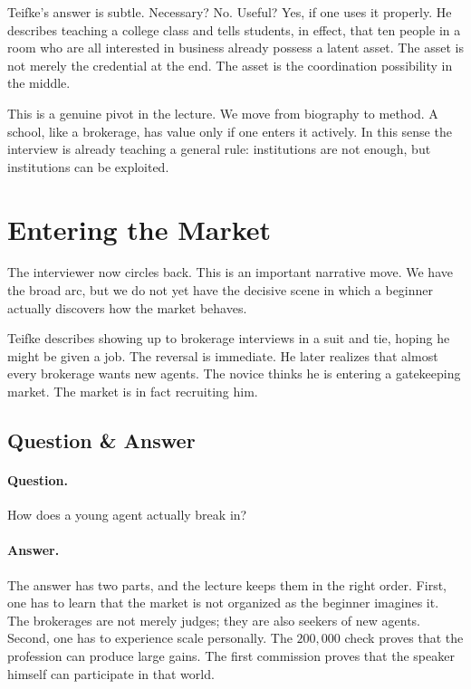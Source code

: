 Teifke's answer is subtle. Necessary? No. Useful? Yes, if one uses it properly. He describes teaching a college class and tells students, in effect, that ten people in a room who are all interested in business already possess a latent asset. The asset is not merely the credential at the end. The asset is the coordination possibility in the middle.

This is a genuine pivot in the lecture. We move from biography to method. A school, like a brokerage, has value only if one enters it actively. In this sense the interview is already teaching a general rule: institutions are not enough, but institutions can be exploited.

\section{Entering the Market}

The interviewer now circles back. This is an important narrative move. We have the broad arc, but we do not yet have the decisive scene in which a beginner actually discovers how the market behaves.

Teifke describes showing up to brokerage interviews in a suit and tie, hoping he might be given a job. The reversal is immediate. He later realizes that almost every brokerage wants new agents. The novice thinks he is entering a gatekeeping market. The market is in fact recruiting him.

\subsection{Question \& Answer}

\paragraph{Question.} How does a young agent actually break in?

\paragraph{Answer.} The answer has two parts, and the lecture keeps them in the right order. First, one has to learn that the market is not organized as the beginner imagines it. The brokerages are not merely judges; they are also seekers of new agents. Second, one has to experience scale personally. The \(200{,}000\) check proves that the profession can produce large gains. The first commission proves that the speaker himself can participate in that world.

